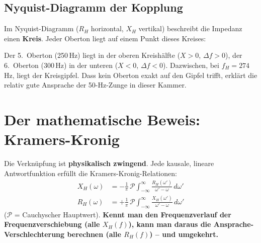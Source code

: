 \documentclass[11pt,a4paper]{article}
\begin{document}
\subsection{Nyquist-Diagramm der Kopplung}

Im Nyquist-Diagramm ($R_H$ horizontal, $X_H$ vertikal) beschreibt die Impedanz einen \textbf{Kreis}. Jeder Oberton liegt auf einem Punkt dieses Kreises:

\begin{table}[H]
\centering\small
{}
\caption{Nyquist-Positionen der Obertöne. Am Gipfel ($f_H$): max.\ Dämpfung, $X_H$ wechselt Vorzeichen.}
\end{table}

Der 5.~Oberton (250\,Hz) liegt in der oberen Kreishälfte ($X > 0$, $\Delta f > 0$), der 6.~Oberton (300\,Hz) in der unteren ($X < 0$, $\Delta f < 0$). Dazwischen, bei $f_H = 274$\,Hz, liegt der Kreisgipfel. Dass kein Oberton exakt auf den Gipfel trifft, erklärt die relativ gute Ansprache der 50-Hz-Zunge in dieser Kammer.

\section{Der mathematische Beweis: Kramers-Kronig}

Die Verknüpfung ist \textbf{physikalisch zwingend}. Jede kausale, lineare Antwortfunktion erfüllt die Kramers-Kronig-Relationen:
\begin{align}
X_H(\omega) &= -\frac{1}{\pi}\, \mathcal{P} \int_{-\infty}^{\infty} \frac{R_H(\omega')}{\omega' - \omega}\, d\omega' \\
R_H(\omega) &= +\frac{1}{\pi}\, \mathcal{P} \int_{-\infty}^{\infty} \frac{X_H(\omega')}{\omega' - \omega}\, d\omega'
\end{align}
($\mathcal{P}$ = Cauchyscher Hauptwert). \textbf{Kennt man den Frequenzverlauf der Frequenzverschiebung (alle $X_H(f)$), kann man daraus die Ansprache-Verschlechterung berechnen (alle $R_H(f)$) -- und umgekehrt.}
\end{document}
